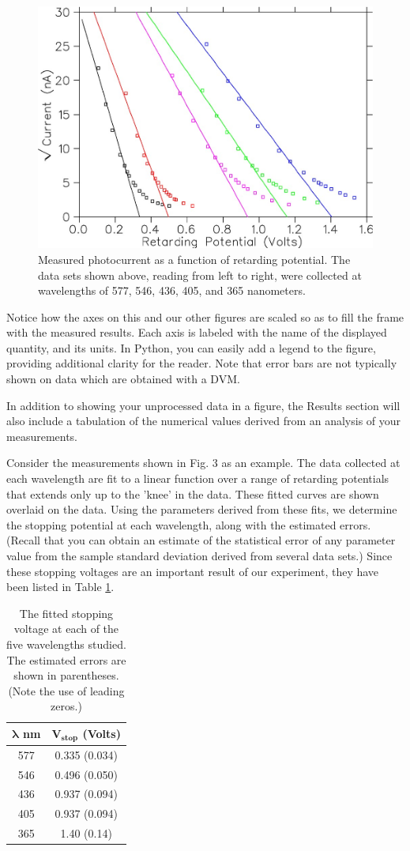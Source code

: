 \begin{figure}[ht]
    \centering
    \includegraphics[width=0.5\linewidth]{figures/photocurrent.png}
    \caption{\footnotesize Measured photocurrent as a function of retarding potential. The data sets shown above, reading from left to right, were collected at wavelengths of 577, 546, 436, 405, and 365 nanometers.\cite{Kov_22}}
    \label{fig:photocurrent}
\end{figure}

Notice how the axes on this and our other figures are scaled so as to fill the frame with the measured results. Each axis is labeled with the name of the displayed quantity, and its units. In Python, you can easily add a legend to the figure, providing additional clarity for the reader. Note that error bars are not typically shown on data which are obtained with a DVM.

In addition to showing your unprocessed data in a figure, the Results section will also include a tabulation of the numerical values derived from an analysis of your measurements.

Consider the measurements shown in Fig. 3 as an example. The data collected at each wavelength are fit to a linear function over a range of retarding potentials that extends only up to the 'knee' in the data. These fitted curves are shown overlaid on the data. Using the parameters derived from these fits, we determine the stopping potential at each wavelength, along with the estimated errors. (Recall that you can obtain an estimate of the statistical error of any parameter value from the sample standard deviation derived from several data sets.) Since these stopping voltages are an important result of our experiment, they have been listed in Table \ref{tab:stopping_voltage}.

\begin{table}[htbp]
    \centering
    \begin{tabular}{| c | c |}
        \hline
        $\bm{\lambda}$ \textbf{nm} & $\bm{V_\textbf{stop}}$ \textbf{(Volts)} \\ \hline
        577 & 0.335 (0.034) \\ \hline
        546 & 0.496 (0.050) \\ \hline
        436 & 0.937 (0.094) \\ \hline
        405 & 0.937 (0.094) \\ \hline
        365 & 1.40 (0.14) \\ \hline
    \end{tabular}
    \caption{\footnotesize The fitted stopping voltage at each of the five wavelengths studied. The estimated errors are shown in parentheses. (Note the use of leading zeros.)}
    \label{tab:stopping_voltage}
\end{table}


